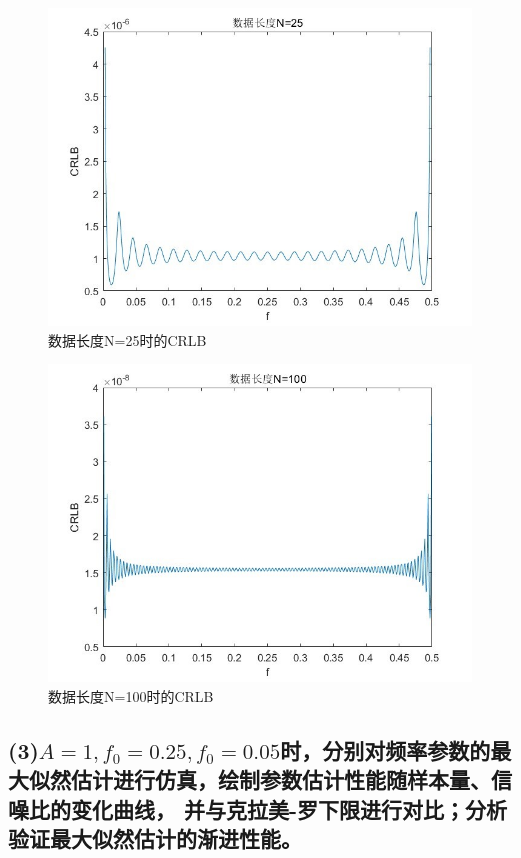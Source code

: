 \documentclass[fontset=windows]{article}
\numberwithin{figure}{section}
\begin{document}
\begin{figure}[H]
	\centering
	\includegraphics[scale=0.7]{fig2.jpg}
	\caption{数据长度N=25时的CRLB}
	\label{2.2}
\end{figure}

\begin{figure}[H]
	\centering
	\includegraphics[scale=0.7]{fig3.jpg}
	\caption{数据长度N=100时的CRLB}
	\label{2.3}
\end{figure}

\subsection*{(3)\(A=1,f_0=0.25,f_0=0.05\)时，分别对频率参数的最大似然估计进行仿真，绘制参数估计性能随样本量、信噪比的变化曲线，
	并与克拉美-罗下限进行对比；分析验证最大似然估计的渐进性能。}
\end{document}
